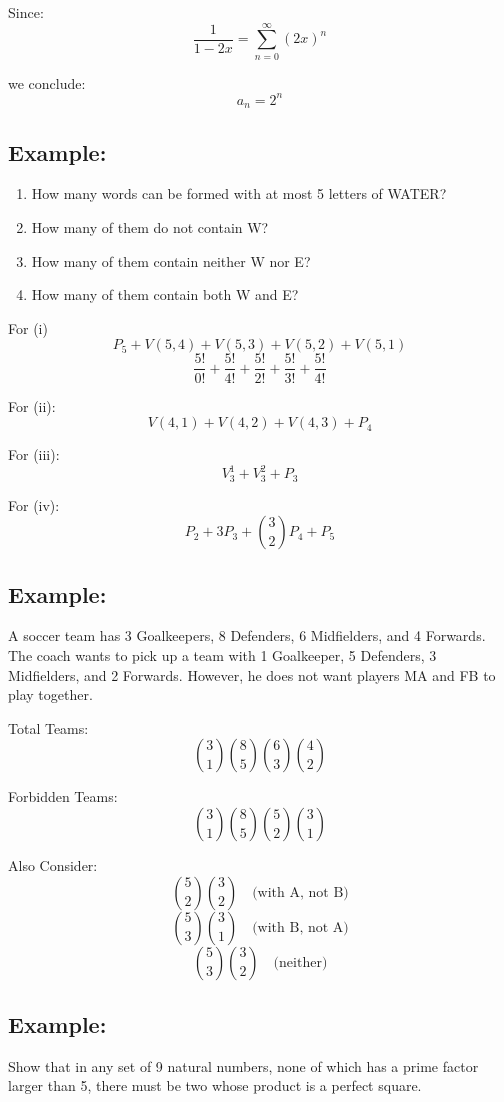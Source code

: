 \documentclass[11pt]{article}
\begin{document}
Since:
\[
\frac{1}{1-2x} = \sum_{n=0}^{\infty} (2x)^n
\]

we conclude:
\[
a_n = 2^n
\]

\subsection*{Example:}
\begin{enumerate}
    \item How many words can be formed with at most 5 letters of WATER?
    \item How many of them do not contain W?
    \item How many of them contain neither W nor E?
    \item How many of them contain both W and E?
\end{enumerate}

For (i)
\[
P_5 + V(5,4) + V(5,3) + V(5,2) + V(5,1)
\]
\[
\frac{5!}{0!} + \frac{5!}{4!} + \frac{5!}{2!} + \frac{5!}{3!} + \frac{5!}{4!}
\]

For (ii):
\[
V(4,1) + V(4,2) + V(4,3) + P_4
\]

For (iii):
\[
V_3^1 + V_3^2 + P_3
\]

For (iv):
\[
P_2 + 3 P_3 + \binom{3}{2} P_4 + P_5
\]

\subsection*{Example:}
A soccer team has 3 Goalkeepers, 8 Defenders, 6 Midfielders, and 4 Forwards. The coach wants to pick up a team with 1 Goalkeeper, 5 Defenders, 3 Midfielders, and 2 Forwards. However, he does not want players MA and FB to play together. 

\vspace{0.5cm}
Total Teams:
\[
\binom{3}{1} \binom{8}{5} \binom{6}{3} \binom{4}{2}
\]

Forbidden Teams:
\[
\binom{3}{1} \binom{8}{5} \binom{5}{2} \binom{3}{1}
\]

Also Consider:
\[
\binom{5}{2} \binom{3}{2} \quad \text{(with A, not B)}
\]
\[
\binom{5}{3} \binom{3}{1} \quad \text{(with B, not A)}
\]
\[
\binom{5}{3} \binom{3}{2} \quad \text{(neither)}
\]

\subsection*{Example:}

Show that in any set of 9 natural numbers, none of which has a prime factor larger than 5, there must be two whose product is a perfect square.
\end{document}
